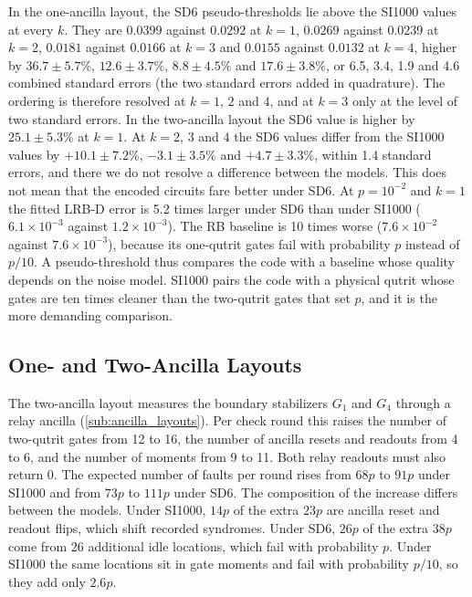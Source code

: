 In the one-ancilla layout, the SD6 pseudo-thresholds lie above the SI1000 values at every $k$. They are $0.0399$ against $0.0292$ at $k = 1$, $0.0269$ against $0.0239$ at $k = 2$, $0.0181$ against $0.0166$ at $k = 3$ and $0.0155$ against $0.0132$ at $k = 4$, higher by $36.7 \pm 5.7\%$, $12.6 \pm 3.7\%$, $8.8 \pm 4.5\%$ and $17.6 \pm 3.8\%$, or 6.5, 3.4, 1.9 and 4.6 combined standard errors (the two standard errors added in quadrature). The ordering is therefore resolved at $k = 1$, $2$ and $4$, and at $k = 3$ only at the level of two standard errors. In the two-ancilla layout the SD6 value is higher by $25.1 \pm 5.3\%$ at $k = 1$. At $k = 2$, $3$ and $4$ the SD6 values differ from the SI1000 values by $+10.1 \pm 7.2\%$, $-3.1 \pm 3.5\%$ and $+4.7 \pm 3.3\%$, within 1.4 standard errors, and there we do not resolve a difference between the models. This does not mean that the encoded circuits fare better under SD6. At $p = 10^{-2}$ and $k = 1$ the fitted LRB-D error is 5.2 times larger under SD6 than under SI1000 ($6.1\times10^{-3}$ against $1.2\times10^{-3}$). The RB baseline is 10 times worse ($7.6\times10^{-2}$ against $7.6\times10^{-3}$), because its one-qutrit gates fail with probability $p$ instead of $p/10$. A pseudo-threshold thus compares the code with a baseline whose quality depends on the noise model. SI1000 pairs the code with a physical qutrit whose gates are ten times cleaner than the two-qutrit gates that set $p$, and it is the more demanding comparison.

\subsection{One- and Two-Ancilla Layouts}
\label{sub:layout_comparison}

The two-ancilla layout measures the boundary stabilizers $G_1$ and $G_4$ through a relay ancilla (\autoref{sub:ancilla_layouts}). Per check round this raises the number of two-qutrit gates from 12 to 16, the number of ancilla resets and readouts from 4 to 6, and the number of moments from 9 to 11. Both relay readouts must also return 0. The expected number of faults per round rises from $68p$ to $91p$ under SI1000 and from $73p$ to $111p$ under SD6. The composition of the increase differs between the models. Under SI1000, $14p$ of the extra $23p$ are ancilla reset and readout flips, which shift recorded syndromes. Under SD6, $26p$ of the extra $38p$ come from 26 additional idle locations, which fail with probability $p$. Under SI1000 the same locations sit in gate moments and fail with probability $p/10$, so they add only $2.6p$.


